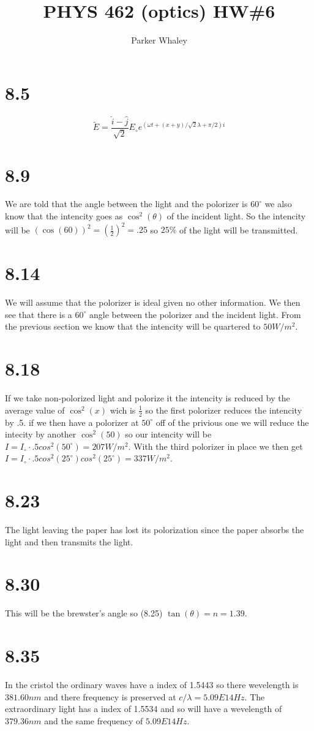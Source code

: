 \documentclass[12pt,a4paper]{article}
\author{Parker Whaley}
\title{PHYS 462 (optics) HW\#6}
\begin{document}
\maketitle
\section{8.5}
$$\tilde{E}=\frac{\hat{i}-\hat{j}}{\sqrt{2}}E_\circ e^{(\omega t+(x+y)/\sqrt{2}\lambda+\pi/2)i}$$
\section{8.9}
We are told that the angle between the light and the polorizer is $60^\circ$ we also know that the intencity goes as $\cos^2(\theta)$ of the incident light.  So the intencity will be $(\cos(60))^2=(\frac{1}{2})^2=.25$ so $25\%$ of the light will be transmitted.
\section{8.14}
We will assume that the polorizer is ideal given no other information.  We then see that there is a $60^\circ$ angle between the polorizer and the incident light.  From the previous section we know that the intencity will be quartered to $50W/m^2$.
\section{8.18}
If we take non-polorized light and polorize it the intencity is reduced by the average value of $\cos^2(x)$ wich is $\frac{1}{2}$ so the first polorizer reduces the intencity by .5.  if we then have a polorizer at $50^\circ$ off of the privious one we will reduce the intecity by another $\cos^2(50)$ so our intencity will be $I=I_\circ\cdot.5cos^2(50^\circ)=207W/m^2$.  With the third polorizer in place we then get $I=I_\circ\cdot.5cos^2(25^\circ)cos^2(25^\circ)=337W/m^2$.
\section{8.23}
The light leaving the paper has lost its polorization since the paper absorbs the light and then transmits the light.
\section{8.30}
This will be the brewster's angle so (8.25) $\tan(\theta)=n=1.39$.
\section{8.35}
In the cristol the ordinary waves have a index of 1.5443 so there wevelength is $381.60nm$ and there frequency is preserved at $c/\lambda=5.09E14Hz$.  The extraordinary light has a index of 1.5534 and so will have a wevelength of $379.36nm$ and the same frequency of $5.09E14Hz$.
\end{document}
